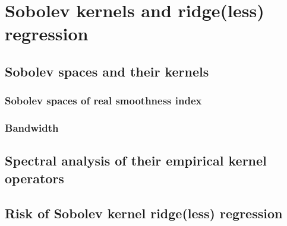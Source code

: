 \chapter{Sobolev kernels and ridge(less) regression}
\label{chapter:sobolev_kernels}

\section{Sobolev spaces and their kernels}
\subsection{Sobolev spaces of real smoothness index}
\subsection{Bandwidth}

\section{Spectral analysis of their empirical kernel operators}

\section{Risk of Sobolev kernel ridge(less) regression}